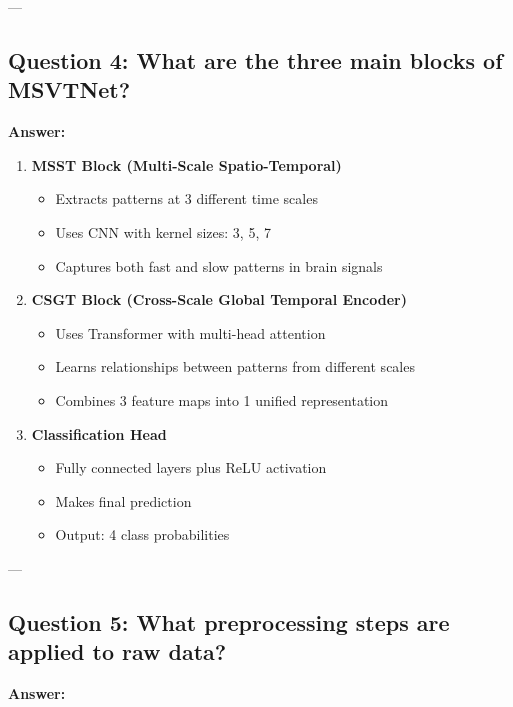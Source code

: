 \documentclass[12pt,a4paper]{article}
\begin{document}
---

\subsection{Question 4: What are the three main blocks of MSVTNet?}

\textbf{Answer:}

\begin{enumerate}
    \item \textbf{MSST Block (Multi-Scale Spatio-Temporal)}
    \begin{itemize}
        \item Extracts patterns at 3 different time scales
        \item Uses CNN with kernel sizes: 3, 5, 7
        \item Captures both fast and slow patterns in brain signals
    \end{itemize}
    
    \item \textbf{CSGT Block (Cross-Scale Global Temporal Encoder)}
    \begin{itemize}
        \item Uses Transformer with multi-head attention
        \item Learns relationships between patterns from different scales
        \item Combines 3 feature maps into 1 unified representation
    \end{itemize}
    
    \item \textbf{Classification Head}
    \begin{itemize}
        \item Fully connected layers plus ReLU activation
        \item Makes final prediction
        \item Output: 4 class probabilities
    \end{itemize}
\end{enumerate}

---

\subsection{Question 5: What preprocessing steps are applied to raw data?}

\textbf{Answer:}
\end{document}

